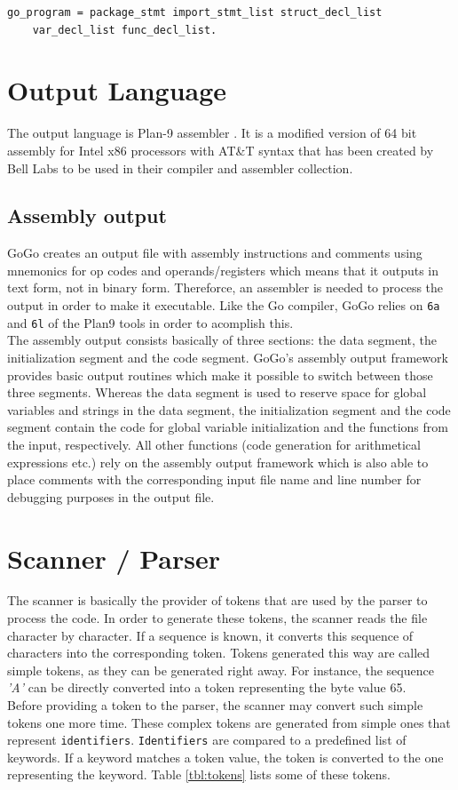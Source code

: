 \documentclass[a4paper]{scrartcl}
\let\chapter\section
\let\section\subsection
\let\subsection\subsubsection
\let\subsubsection\paragraph
\let\paragraph\subparagraph
\let\subparagraph\undefined
\begin{document}
        \begin{lstlisting}[caption=GoGo Program]
go_program = package_stmt import_stmt_list struct_decl_list 
    var_decl_list func_decl_list.
        \end{lstlisting}


  \chapter{Output Language}
    The output language is Plan-9 assembler \cite{pik00}. It is a modified version of 64 bit assembly for Intel x86 processors with AT\&T syntax that has been created by Bell Labs to be used in their compiler and assembler collection.
    
    \section{Assembly output}
      GoGo creates an output file with assembly instructions and comments using mnemonics for op codes and operands/registers which means that it outputs in text form, not in binary form. Thereforce, an assembler is needed to process the output in order to make it executable. Like the Go compiler, GoGo relies on \texttt{6a} and \texttt{6l} of the Plan9 tools in order to acomplish this\cite{pik00}.\\
      The assembly output consists basically of three sections: the data segment, the initialization segment and the code segment. GoGo's assembly output framework provides basic output routines which make it possible to switch between those three segments. Whereas the data segment is used to reserve space for global variables and strings in the data segment, the initialization segment and the code segment contain the code for global variable initialization and the functions from the input, respectively. All other functions (code generation for arithmetical expressions etc.) rely on the assembly output framework which is also able to place comments with the corresponding input file name and line number for debugging purposes in the output file.

  \chapter{Scanner / Parser}
    The scanner is basically the provider of tokens that are used by the parser
    to process the code. In order to generate these tokens, the scanner reads
    the file character by character. If a sequence is known, it converts this 
    sequence of characters into the corresponding token. Tokens generated this
    way are called simple tokens, as they can be generated right away. For 
    instance, the sequence \textit{'A'} can be directly converted into a token 
    representing the byte value 65. \\
    Before providing a token to the parser, the scanner may convert such 
    simple tokens one more time. These complex tokens are generated from simple
    ones that represent \texttt{identifiers}. \texttt{Identifiers} are compared to a 
    predefined list of keywords. If a keyword matches a token value, the token
    is converted to the one representing the keyword. Table \ref{tbl:tokens} 
    lists some of these tokens.
\end{document}
